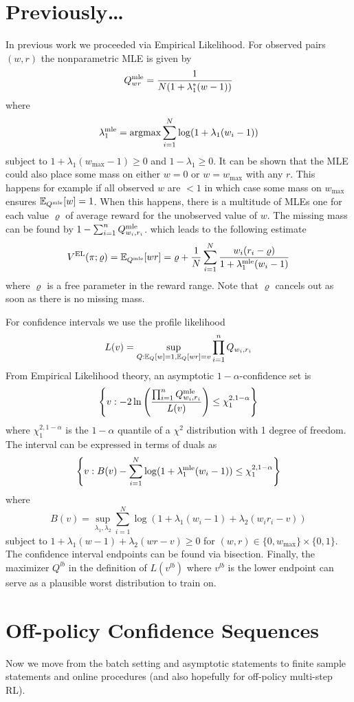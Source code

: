 \section{Previously\ldots}
In previous work we proceeded via Empirical Likelihood.
For observed pairs $(w,r)$ the nonparametric MLE is given by 
\[
Q^{\textrm{mle}}_{wr} = \frac{1}{N(1+\lambda_1^*(w-1))}
\]
where 
\[
\lambda_1^{\textrm{mle}} = \operatorname{argmax} \sum_{i=1}^N \log(1+\lambda_1(w_i-1))
\]
subject to $1+\lambda_1(w_{\max}-1)\geq 0$
and $1-\lambda_1\geq 0$. It can be shown 
that the MLE could also 
place some mass on either $w=0$ or $w=w_{\max}$
with any $r$. This happens for example if 
all observed $w$ are $<1$ in which case some
mass on $w_{\max}$ ensures $\mathbb{E}_{Q^{\textrm{mle}}}[w]=1$.
When this happens, there is a multitude of MLEs
one for each value $\varrho$ of average reward for the 
unobserved value of $w$. The missing  
mass can be found by $1-\sum_{i=1}^n Q^{\textrm{mle}}_{w_i,r_i}$.
which leads to the following estimate
\[
V^{\textrm{EL}}(\pi;\varrho)=\mathbb{E}_{Q^{\textrm{mle}}}[wr]=\varrho+
\frac{1}{N}\sum_{i=1}^N \frac{w_i(r_i-\varrho)}{1+\lambda_1^{\textrm{mle}}(w_i-1)}
\]
where $\varrho$ is a free parameter in the reward range.
Note that $\varrho$
cancels out as soon as there is no missing mass.

For confidence intervals we use the profile likelihood
\[
L(v)=\sup_{Q: \mathbb{E}_Q[w]=1, \mathbb{E}_Q[wr]=v} \prod_{i=1}^n Q_{w_i,r_i}
\]
From Empirical Likelihood theory, an asymptotic 
$1-\alpha$-confidence set is 
\[
\left\{v: -2\ln\left(\frac{\prod_{i=1}^n Q^{\textrm{mle}}_{w_i,r_i}}{L(v)}\right)
\leq \chi_1^{2,1-\alpha}\right\}
\]
where $\chi_1^{2,1-\alpha}$ is the $1-\alpha$ quantile of a $\chi^2$
distribution with 1 degree of freedom.
The interval can be expressed in terms of duals as
\[
\left\{v: 
B(v)-\sum_{i=1}^N\log(1+\lambda_1^{\textrm{mle}}(w_i-1))
\leq \chi_1^{2,1-\alpha}\right\}
\]
where
\[
B(v) = \sup_{\lambda_1,\lambda_2} \sum_{i=1}^N \log(1+\lambda_1(w_i-1)+\lambda_2(w_i r_i -v))
\]
subject to $1+\lambda_1(w-1)+\lambda_2(wr-v)\geq 0$
for $(w,r) \in \{0,w_{\max}\}\times \{0,1\}$.
The confidence interval endpoints can be found via 
bisection. 
Finally, the maximizer $Q^{lb}$ in the definition of
$L(v^{lb})$
where $v^{lb}$ is the lower endpoint can serve as
a plausible worst distribution to train on.

\section{Off-policy Confidence Sequences}
Now we move from the batch setting and asymptotic statements to 
finite sample statements and online procedures (and also 
hopefully for off-policy multi-step RL).

